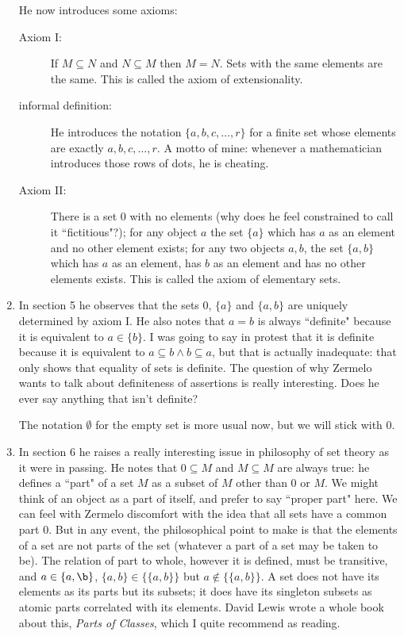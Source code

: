 \documentclass[12pt]{article}
\begin{document}
\begin{enumerate}
He now introduces some axioms:

\begin{description}

\item[Axiom I:]  If $M \subseteq N$ and $N \subseteq M$ then $M=N$.  Sets with the same elements are the same.  This is called the axiom of extensionality.

\item[informal definition:]  He introduces the notation $\{a,b,c,\ldots,r\}$ for a finite set whose elements are exactly $a,b,c,\ldots,r$.  A motto of mine:  whenever a mathematician introduces those rows of dots, he is cheating.

\item[Axiom II:]  There is a set 0 with no elements (why does he feel constrained to call it ``fictitious"?);  for any object $a$ the set $\{a\}$ which has $a$ as an element and no other element exists;  for any two objects $a,b$, the set $\{a,b\}$ which has $a$ as an element, has $b$ as an element and has no other elements exists.  This is called the axiom of elementary sets.

\end{description}

\item In section 5 he observes that the sets 0, $\{a\}$ and $\{a,b\}$ are uniquely determined by axiom I.  He also notes that $a=b$ is always ``definite" because it is equivalent to
$a \in \{b\}$.  I was going to say in protest that it is definite because it is equivalent to $a \subseteq b \wedge b \subseteq a$, but that is actually inadequate:  that only shows that equality of sets is definite.  The question of why Zermelo wants to talk about definiteness of assertions is really interesting.  Does he ever say anything that isn't definite?

The notation $\emptyset$ for the empty set is more usual now, but we will stick with 0.

\item In section 6 he raises a really interesting issue in philosophy of set theory as it were in passing.  He notes that $0 \subseteq M$ and $M \subseteq M$ are always true:  he defines a ``part" of a set $M$ as a subset of $M$ other than 0 or $M$.  We might think of an object as a part of itself, and prefer to say ``proper part" here.  We can feel with Zermelo discomfort with the idea that all sets have a common part 0.  But in any event, the philosophical point to make is that the elements of a set are not parts of the set (whatever a part of a set may be taken to be).  The relation of part to whole, however it is defined, must be transitive, and $a \in \{a,\b\}$, $\{a,b\} \in \{\{a,b\}\}$ but $a \not\in \{\{a,b\}\}$.  A set does not have its elements as its parts but its subsets;  it does have its singleton subsets as atomic parts correlated with its elements.  David Lewis wrote a whole book about this, {\em Parts of Classes\/}, which I quite recommend as reading.


\end{enumerate}
\end{document}
